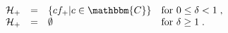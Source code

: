 \begin{equation}
\begin{array}{lcll}
\mathcal{H}_+ & = & \{ cf_+ | c \in \mathbbm{C} \} & \text{for } 0
\leq \delta < 1 \;, \\
\mathcal{H}_+ & = & \emptyset & \text{for } \delta \geq 1\;.
\end{array}
\end{equation}

